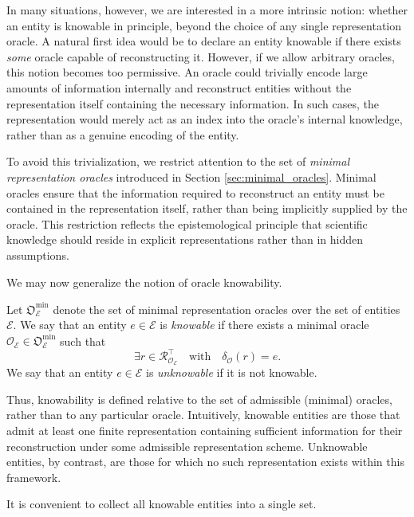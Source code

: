 In many situations, however, we are interested in a more intrinsic notion: whether an entity is knowable in principle, beyond the choice of any single representation oracle. A natural first idea would be to declare an entity knowable if there exists \emph{some} oracle capable of reconstructing it. However, if we allow arbitrary oracles, this notion becomes too permissive. An oracle could trivially encode large amounts of information internally and reconstruct entities without the representation itself containing the necessary information. In such cases, the  representation would merely act as an index into the oracle's internal knowledge, rather than as a genuine encoding of the entity.

To avoid this trivialization, we restrict attention to the set of \emph{minimal representation oracles} introduced in Section \ref{sec:minimal_oracles}. Minimal oracles ensure that the information required to reconstruct an entity must be contained in the representation itself, rather than being implicitly supplied by the oracle. This restriction reflects the epistemological principle that scientific knowledge should reside in explicit representations rather than in hidden assumptions.

We may now generalize the notion of oracle knowability.

\begin{definition}
Let $\mathfrak{O}_{\mathcal{E}}^{\min}$ denote the set of minimal representation oracles over the set of entities $\mathcal{E}$. We say that an entity $e \in \mathcal{E}$ is \emph{knowable}
if there exists a minimal oracle $\mathcal{O}_{\mathcal{E}} \in \mathfrak{O}_{\mathcal{E}}^{\min}$ such that
\[
\exists r \in \mathcal{R}_{\mathcal{O}_{\mathcal{E}}}^{\top}
\quad\text{with}\quad
\delta_{\mathcal O}(r)=e.
\]
We say that an entity $e \in \mathcal{E}$ is \emph{unknowable} if it is not knowable.
\end{definition}

Thus, knowability is defined relative to the set of admissible (minimal) oracles, rather than to any particular oracle. Intuitively, knowable entities are those that admit at least one finite representation containing sufficient information for their reconstruction under some admissible representation scheme. Unknowable entities, by contrast, are those for which no such representation exists within this framework.

It is convenient to collect all knowable entities into a single set.

